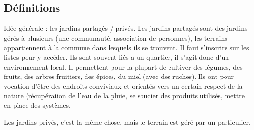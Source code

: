 \documentclass[french,a4paper]{article}
\begin{document}
\subsection{Définitions}
Idée générale : les jardins partagés / privés. Les jardins partagés sont des jardins gérés à plusieurs (une communauté, association de personnes), les terrains appartiennent à la commune dans lesquels ils se trouvent. Il faut s’inscrire sur les listes pour y accéder. Ils sont souvent liés a un quartier, il s’agit donc d’un environnement local. Il permettent pour la plupart de cultiver des légumes, des fruits, des arbres fruitiers, des épices, du miel (avec des ruches). Ils ont pour vocation d’être des endroits conviviaux et orientés vers un certain respect de la nature (récupération de l’eau de la pluie, se soucier des produits utilisés, mettre en place des systèmes.

Les jardins privés, c’est la même chose, mais le terrain est géré par un particulier.
\end{document}
